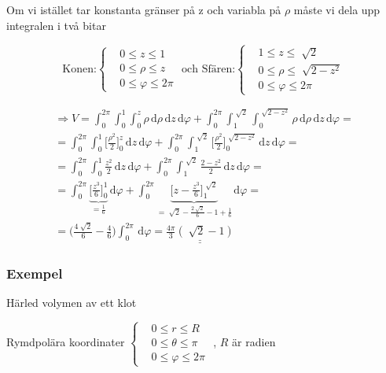 \documentclass[a4paper]{article}
\newcommand{\svar}[1]{\underline{\underline{#1}}}
\let\oldsqrt\sqrt
\renewcommand*{\sqrt}[2][\ ]{\oldsqrt[#1]{#2} }
\begin{document}
\newpage

Om vi istället tar konstanta gränser på z och variabla på $\rho$ måste vi dela upp integralen i två bitar

$$
	\text{Konen:}
	\begin{cases}
		&0 \leq z \leq 1 \\
		&0 \leq \rho \leq z \\
		&0 \leq \varphi \leq 2\pi
	\end{cases}
	\text{ och Sfären:}
	\begin{cases}
		&1 \leq z \leq \sqrt{2} \\
		&0 \leq \rho \leq \sqrt{2-z^2} \\
		&0 \leq \varphi \leq 2\pi
	\end{cases}
$$

\begin{gather*}
	\Rightarrow V = \int_0^{2\pi}\int_0^1\int_0^z \rho \,\mathrm{d}\rho\,\mathrm{d}z\,\mathrm{d}\varphi + \int_0^{2\pi}\int_1^{\sqrt{2}}\int_0^{\sqrt{2-z^2}} \rho \,\mathrm{d}\rho\,\mathrm{d}z\,\mathrm{d}\varphi = \\
	= \int_0^{2\pi}\int_0^1 \Big[ \frac{\rho^2}{2} \Big]_0^z \,\mathrm{d}z\,\mathrm{d}\varphi + \int_0^{2\pi}\int_1^{\sqrt{2}} \Big[ \frac{\rho^2}{2} \Big]_0^{\sqrt{2-z^2}} \,\mathrm{d}z\,\mathrm{d}\varphi = \\
	= \int_0^{2\pi}\int_0^1 \frac{z^2}{2} \,\mathrm{d}z\,\mathrm{d}\varphi + \int_0^{2\pi}\int_1^{\sqrt{2}} \frac{2-z^2}{2} \,\mathrm{d}z\,\mathrm{d}\varphi = \\
	= \int_0^{2\pi} \underbrace{\Big[ \frac{z^3}{6} \Big]_0^1}_{=\frac{1}{6}}\,\mathrm{d}\varphi + \int_0^{2\pi} \underbrace{\Big[ z-\frac{z^3}{6} \Big]_1^{\sqrt{2}}}_{=\sqrt{2}-\frac{2\sqrt{2}}{6}-1+\frac{1}{6}} \,\mathrm{d}\varphi = \\
	= \Big( \frac{4\sqrt{2}}{6} - \frac{4}{6} \Big) \int_0^{2\pi}\,\mathrm{d}\varphi =
	\svar{\frac{4\pi}{3}(\sqrt{2}-1)}
\end{gather*}

\newpage
\subsubsection{Exempel}
Härled volymen av ett klot \newline

Rymdpolära koordinater $
\begin{cases}
	&0 \leq r \leq R \\
	&0 \leq \theta \leq \pi \\
	&0 \leq \varphi \leq 2\pi
\end{cases}$
 , $R$ är radien
\end{document}
